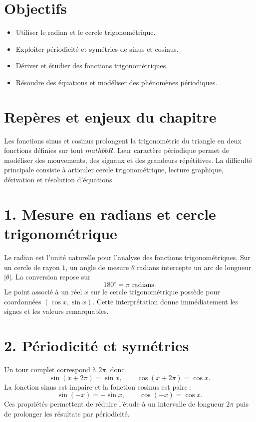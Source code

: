 
\section{Objectifs}
\begin{itemize}
\item Utiliser le radian et le cercle trigonométrique.
\item Exploiter périodicité et symétries de sinus et cosinus.
\item Dériver et étudier des fonctions trigonométriques.
\item Résoudre des équations et modéliser des phénomènes périodiques.
\end{itemize}

\section{Repères et enjeux du chapitre}
Les fonctions sinus et cosinus prolongent la trigonométrie du triangle en deux fonctions définies sur tout $mathbb{R}$. Leur caractère périodique permet de modéliser des mouvements, des signaux et des grandeurs répétitives. La difficulté principale consiste à articuler cercle trigonométrique, lecture graphique, dérivation et résolution d’équations.

\section{1. Mesure en radians et cercle trigonométrique}
Le radian est l’unité naturelle pour l’analyse des fonctions trigonométriques. Sur un cercle de rayon $1$, un angle de mesure $\theta$ radians intercepte un arc de longueur $|\theta|$. La conversion repose sur
\[
180^\circ=\pi\text{ radians}.
\]
Le point associé à un réel $x$ sur le cercle trigonométrique possède pour coordonnées $(\cos x,\sin x)$. Cette interprétation donne immédiatement les signes et les valeurs remarquables.

\section{2. Périodicité et symétries}
Un tour complet correspond à $2\pi$, donc
\[
\sin(x+2\pi)=\sin x,\qquad \cos(x+2\pi)=\cos x.
\]
La fonction sinus est impaire et la fonction cosinus est paire :
\[
\sin(-x)=-\sin x,\qquad \cos(-x)=\cos x.
\]
Ces propriétés permettent de réduire l’étude à un intervalle de longueur $2\pi$ puis de prolonger les résultats par périodicité.

